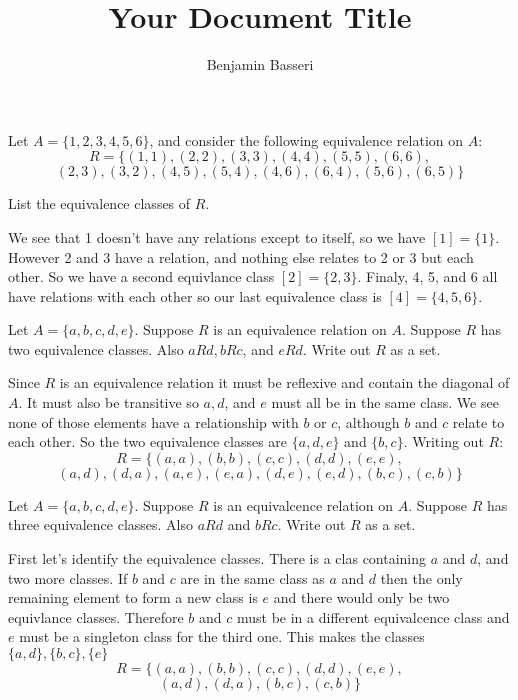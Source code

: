 \documentclass{article}
\title{Your Document Title}
\author{Benjamin Basseri}
\begin{document}
\maketitle

\begin{problem}
Let $A = \{1, 2, 3, 4, 5, 6\}$, and consider the following equivalence relation on $A$:
$$R = \{(1, 1), (2, 2), (3, 3), (4, 4), (5, 5), (6, 6),$$
$$(2, 3), (3, 2), (4, 5), (5, 4), (4, 6), (6, 4), (5, 6), (6, 5)\}$$

List the equivalence classes of $R$.
\end{problem}

We see that 1 doesn't have any relations except to itself, so we have $[1] = \{1\}$. However 2 and 3 have a relation, and nothing else relates to 2 or 3 but each other. So we have a second equivlance class $[2] = \{2, 3\}$. Finaly, 4, 5, and 6 all have relations with each other so our last equivalence class is $[4] = \{4, 5, 6\}$.

\begin{problem}
Let $A = \{a, b, c, d, e\}$. Suppose $R$ is an equivalence relation on $A$. Suppose $R$ has two equivalence classes. Also $aRd, bRc$, and $eRd$. Write out $R$ as a set.
\end{problem}

Since $R$ is an equivalence relation it must be reflexive and contain the diagonal of $A$. It must also be transitive so $a, d$, and $e$ must all be in the same class. We see none of those elements have a relationship with $b$ or $c$, although $b$ and $c$ relate to each other. So the two equivalence classes are $\{a, d, e\}$ and $\{b, c\}$. Writing out $R$:
$$R = \{(a, a), (b, b), (c, c), (d, d), (e, e), $$
$$(a, d), (d, a), (a, e), (e, a), (d, e), (e, d), (b, c), (c, b)\}$$

\begin{problem}
Let $A = \{a, b, c, d, e\}$. Suppose $R$ is an equivalcence relation on $A$. Suppose $R$ has three equivalence classes. Also $aRd$ and $bRc$. Write out $R$ as a set.
\end{problem}

First let's identify the equivalence classes. There is a clas containing $a$ and $d$, and two more classes. If $b$ and $c$ are in the same class as $a$ and $d$ then the only remaining element to form a new class is $e$ and there would only be two equivlance classes. Therefore $b$ and $c$ must be in a different equivalcence class and $e$ must be a singleton class for the third one. This makes the classes $\{a, d\}, \{b, c\}, \{e\}$
$$R = \{(a, a), (b, b), (c, c), (d, d), (e, e), $$
$$(a, d), (d, a), (b, c), (c, b)\}$$
\end{document}

